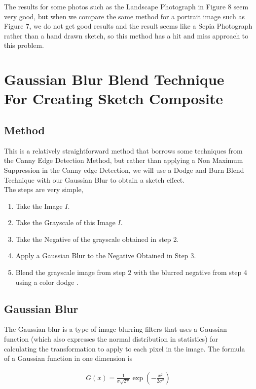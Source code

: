\documentclass{article}
\begin{document}
The results for some photos such as the Landscape Photograph in Figure 8 seem very good, but when we 
compare the same method for a portrait image such as Figure 7, we do not get good results and the 
result seems like a Sepia Photograph rather than a hand drawn sketch, so this method has a hit and miss
approach to this problem.

\clearpage
\section{Gaussian Blur Blend Technique For Creating Sketch Composite}
\subsection{Method}
This is a relatively straightforward method that borrows some techniques from the Canny Edge Detection 
Method, but rather than applying a Non Maximum Suppression in the Canny edge Detection, we will use a 
Dodge and Burn Blend Technique with our Gaussian Blur to obtain a sketch effect. \cite{gaussian-blend} \\

The steps are very simple, 

\begin{enumerate}
    \item Take the Image $I$.
    \item Take the Grayscale \cite{grayscale-image} of this Image $I$.
    \item Take the Negative of the grayscale obtained in step 2.
    \item Apply a Gaussian Blur \cite{gaussian-blur} to the Negative Obtained in Step 3.
    \item Blend the grayscale image from step 2 with the blurred negative from step 4 using a color dodge \cite{color-dodge}.
\end{enumerate}

\subsection{Gaussian Blur}

The Gaussian blur is a type of image-blurring filters that uses a Gaussian function (which also expresses the normal distribution in statistics) for calculating the transformation to apply to each pixel in the image. The formula of a Gaussian function in one dimension is

\begin{align*}
    G(x) = \frac{1}{\sigma \sqrt{2 \pi}} \exp \left( - \frac{x^2}{2 \sigma^2}\right)
\end{align*}
\end{document}
